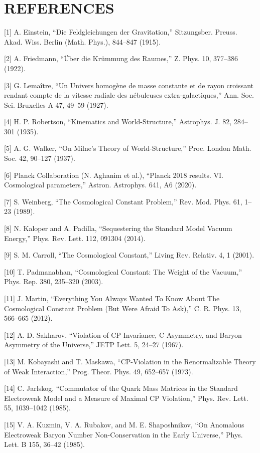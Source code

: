 \documentclass[aps,prd,onecolumn,superscriptaddress,nofootinbib,longbibliography,10pt]{revtex4-2}
\begin{document}
 

  
\section*{REFERENCES}

  [1] A. Einstein, “Die Feldgleichungen der Gravitation,” Sitzungsber. Preuss. Akad. Wiss. Berlin (Math. Phys.), 844–847 (1915).


  [2] A. Friedmann, “Über die Krümmung des Raumes,” Z. Phys. 10, 377–386 (1922).


  [3] G. Lemaître, “Un Univers homogène de masse constante et de rayon croissant rendant compte de la vitesse radiale des nébuleuses extra-galactiques,” Ann. Soc. Sci. Bruxelles A 47, 49–59 (1927).


  [4] H. P. Robertson, “Kinematics and World-Structure,” Astrophys. J. 82, 284–301 (1935).


  [5] A. G. Walker, “On Milne’s Theory of World-Structure,” Proc. London Math. Soc. 42, 90–127 (1937).


  [6] Planck Collaboration (N. Aghanim et al.), “Planck 2018 results. VI. Cosmological parameters,” Astron. Astrophys. 641, A6 (2020).


  [7] S. Weinberg, “The Cosmological Constant Problem,” Rev. Mod. Phys. 61, 1–23 (1989).


  [8] N. Kaloper and A. Padilla, “Sequestering the Standard Model Vacuum Energy,” Phys. Rev. Lett. 112, 091304 (2014).


  [9] S. M. Carroll, “The Cosmological Constant,” Living Rev. Relativ. 4, 1 (2001).


  [10] T. Padmanabhan, “Cosmological Constant: The Weight of the Vacuum,” Phys. Rep. 380, 235–320 (2003).


  [11] J. Martin, “Everything You Always Wanted To Know About The Cosmological Constant Problem (But Were Afraid To Ask),” C. R. Phys. 13, 566–665 (2012).


  [12] A. D. Sakharov, “Violation of CP Invariance, C Asymmetry, and Baryon Asymmetry of the Universe,” JETP Lett. 5, 24–27 (1967).


  [13] M. Kobayashi and T. Maskawa, “CP-Violation in the Renormalizable Theory of Weak Interaction,” Prog. Theor. Phys. 49, 652–657 (1973).


  [14] C. Jarlskog, “Commutator of the Quark Mass Matrices in the Standard Electroweak Model and a Measure of Maximal CP Violation,” Phys. Rev. Lett. 55, 1039–1042 (1985).


  [15] V. A. Kuzmin, V. A. Rubakov, and M. E. Shaposhnikov, “On Anomalous Electroweak Baryon Number Non-Conservation in the Early Universe,” Phys. Lett. B 155, 36–42 (1985).
\end{document}
